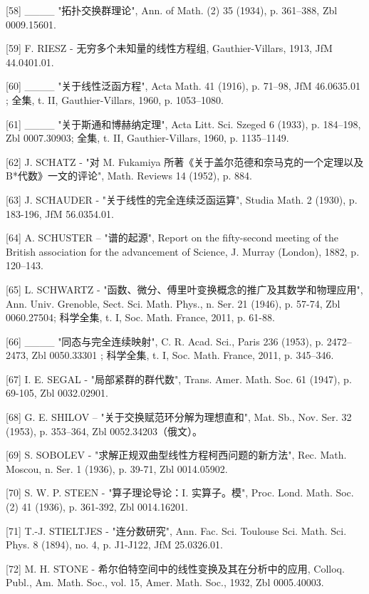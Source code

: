 {[}58{]} \_\_\_\_ "拓扑交换群理论", Ann. of Math. (2) 35 (1934), p. 361--388, Zbl 0009.15601.

{[}59{]} F. RIESZ - 无穷多个未知量的线性方程组, Gauthier-Villars, 1913, JfM 44.0401.01.

{[}60{]} \_\_\_\_ "关于线性泛函方程", Acta Math. 41 (1916), p. 71--98, JfM 46.0635.01 ; 全集, t. II, Gauthier-Villars, 1960, p. 1053--1080.

{[}61{]} \_\_\_\_ "关于斯通和博赫纳定理", Acta Litt. Sci. Szeged 6 (1933), p. 184--198, Zbl 0007.30903; 全集, t. II, Gauthier-Villars, 1960, p. 1135--1149.

{[}62{]} J. SCHATZ - "对 M. Fukamiya 所著《关于盖尔范德和奈马克的一个定理以及 B*代数》一文的评论", Math. Reviews 14 (1952), p. 884.

{[}63{]} J. SCHAUDER - "关于线性的完全连续泛函运算", Studia Math. 2 (1930), p. 183-196, JfM 56.0354.01.

{[}64{]} A. SCHUSTER -- "谱的起源", Report on the fifty-second meeting of the British association for the advancement of Science, J. Murray (London), 1882, p. 120--143.

{[}65{]} L. SCHWARTZ - "函数、微分、傅里叶变换概念的推广及其数学和物理应用", Ann. Univ. Grenoble, Sect. Sci. Math. Phys., n. Ser. 21 (1946), p. 57-74, Zbl 0060.27504; 科学全集, t. I, Soc. Math. France, 2011, p. 61-88.

{[}66{]} \_\_\_\_ "同态与完全连续映射", C. R. Acad. Sci., Paris 236 (1953), p. 2472--2473, Zbl 0050.33301 ; 科学全集, t. I, Soc. Math. France, 2011, p. 345--346.

{[}67{]} I. E. SEGAL - "局部紧群的群代数", Trans. Amer. Math. Soc. 61 (1947), p. 69-105, Zbl 0032.02901.

{[}68{]} G. E. SHILOV -- "关于交换赋范环分解为理想直和", Mat. Sb., Nov. Ser. 32 (1953), p. 353--364, Zbl 0052.34203（俄文）。

{[}69{]} S. SOBOLEV - "求解正规双曲型线性方程柯西问题的新方法", Rec. Math. Moscou, n. Ser. 1 (1936), p. 39-71, Zbl 0014.05902.

{[}70{]} S. W. P. STEEN - "算子理论导论：I. 实算子。模", Proc. Lond. Math. Soc. (2) 41 (1936), p. 361-392, Zbl 0014.16201.

{[}71{]} T.-J. STIELTJES - "连分数研究", Ann. Fac. Sci. Toulouse Sci. Math. Sci. Phys. 8 (1894), no. 4, p. J1-J122, JfM 25.0326.01.

{[}72{]} M. H. STONE - 希尔伯特空间中的线性变换及其在分析中的应用, Colloq. Publ., Am. Math. Soc., vol. 15, Amer. Math. Soc., 1932, Zbl 0005.40003.

